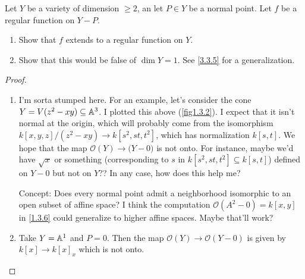 \label{1.3.20}

Let $Y$ be a variety of dimension $\geq 2$, an let $P \in Y$ be a normal point. Let $f$ be a regular function on $Y - P$.

\begin{enumerate}[label = (\alph*)]
    \item Show that $f$ extends to a regular function on $Y$.

    \item Show that this would be false of $\dim Y = 1$. See \ref{3.3.5} for a generalization.
\end{enumerate}

\begin{proof}
    \begin{enumerate}[label = (\alph*)]
        \item I'm sorta stumped here. For an example, let's consider the cone $Y = V(z^2 - xy) \subseteq \mathbb A^3$. I plotted this above (\ref{fig1.3.2}). I expect that it isn't normal at the origin, which will probably come from the isomorphism $k[x, y, z]/(z^2 - xy) \longrightarrow k[s^2, st, t^2]$, which has normalization $k[s, t]$. We hope that the map $\mathcal O(Y) \longrightarrow \mathcal(Y - 0)$ is not onto. For instance, maybe we'd have $\sqrt{x}$ or something (corresponding to $s$ in $k[s^2, st, t^2] \subseteq k[s, t]$) defined on $Y - 0$ but not on $Y$?? In any case, how does this help me?

        Concept: Does every normal point admit a neighborhood isomorphic to an open subset of affine space? I think the computation $\mathcal O(A^2 - 0) = k[x, y]$ in \ref{1.3.6} could generalize to higher affine spaces. Maybe that'll work?

        \item Take $Y = \mathbb A^1$ and $P = 0$. Then the map $\mathcal O(Y) \longrightarrow \mathcal O(Y - 0)$ is given by $k[x] \longrightarrow k[x]_x$ which is not onto.
    \end{enumerate}
\end{proof}
